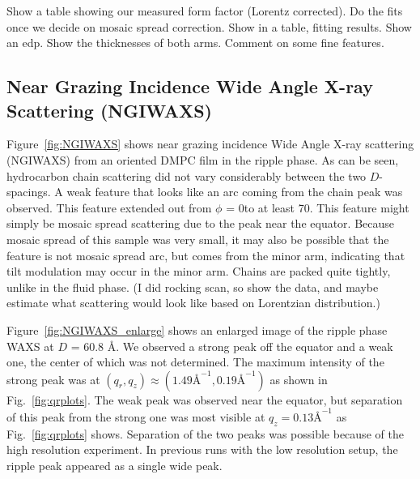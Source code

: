 Show a table showing our measured form factor (Lorentz corrected). Do the 
fits once we decide on mosaic spread correction. Show in a table, fitting 
results. Show an edp. Show the thicknesses of both arms. Comment on
some fine features.

\subsection{Near Grazing Incidence Wide Angle X-ray Scattering (NGIWAXS)}
Figure~\ref{fig:NGIWAXS} shows near grazing incidence Wide Angle X-ray
scattering (NGIWAXS) from an oriented DMPC film in the ripple phase.
As can be seen, hydrocarbon chain scattering did not vary considerably
between the two $D$-spacings. A weak feature that looks like an 
arc coming from the chain peak was observed. This feature extended
out from $\phi$ = 0\textdegree to at least 70\textdegree. This feature
might simply be mosaic spread scattering due to the peak near the equator.
Because mosaic spread of this sample was very small, 
it may also be possible that the feature is not mosaic spread arc,
but comes from the minor arm, indicating
that tilt modulation may occur in the minor arm. Chains are
packed quite tightly, unlike in the fluid phase. (I did rocking scan,
so show the data, and maybe estimate what scattering would look like 
based on Lorentzian distribution.)

Figure~\ref{fig:NGIWAXS_enlarge} shows an enlarged image of the ripple 
phase WAXS at $D$ = 60.8 \AA. We observed a strong peak off the 
equator and a weak one, the center of which was not determined. 
The maximum intensity of the strong peak was at 
$(q_r, q_z) \approx (1.49 \text{\AA}^{-1}, 0.19 \text{\AA}^{-1})$ as shown
in Fig.~\ref{fig:qrplots}. The weak peak was observed near the equator, but 
separation of this peak from the strong one was most visible at 
$q_z = 0.13 \textrm{\AA}^{-1}$ as Fig.~\ref{fig:qrplots} shows. Separation
of the two peaks was possible because of the high resolution experiment. 
In previous runs with the low resolution setup, the ripple peak
appeared as a single wide peak.

